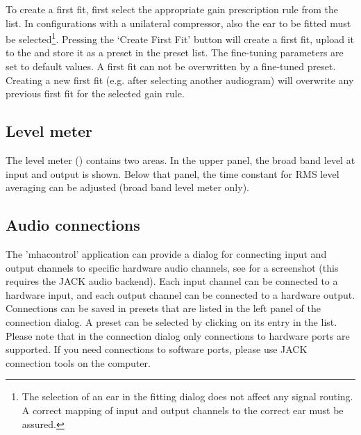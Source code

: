 \documentclass[11pt,a4paper,twoside]{article}
\newcommand{\+}{\discretionary{\mbox{\scriptsize$\hookleftarrow$}}{}{}}
\begin{document}
To create a first fit, first select the appropriate gain prescription
rule from the list. In \mha{} configurations with a unilateral
compressor, also the ear to be fitted must be selected\footnote{The
  selection of an ear in the fitting dialog does not affect any signal
  routing. A correct mapping of \mha{} input and output channels to the
  correct ear must be assured.}. Pressing the `Create First Fit'
button will create a first fit, upload it to the \mha{} and store it as a
preset in the preset list. The fine-tuning parameters are set to
default values.  A first fit can not be overwritten by a fine-tuned
preset.  Creating a new first fit (e.g. after selecting another
audiogram) will overwrite any previous first fit for the selected gain
rule.


\subsection{Level meter}\label{sec:levels}

The level meter () contains two areas.
%
In the upper panel, the broad band level at input and output is shown.
%
Below that panel, the time constant for RMS level averaging can be
adjusted (broad band level meter only).


\subsection{Audio connections}\label{sec:audioconnections}

The 'mhacontrol' application can provide a dialog for connecting input
and output channels to specific hardware audio channels, see
 for a screenshot (this
requires the JACK audio backend).
%
Each \mha{} input channel can be connected to a hardware input, and
each output channel can be connected to a hardware output.
%
Connections can be saved in presets that are listed in the left panel of the connection dialog.
%
A preset can be selected by clicking on its entry in the list.
%
Please note that in the connection dialog only connections to hardware
ports are supported.
%
If you need connections to software ports, please use JACK connection
tools on the \mha{} computer.
%
\end{document}
